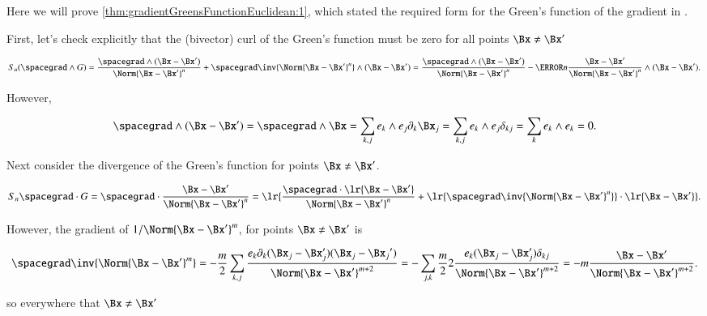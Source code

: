 %
%
\label{chap:gradientGreensFunctionProof}
Here we will prove \cref{thm:gradientGreensFunctionEuclidean:1}, which stated the required form for the Green's function of the gradient in .

First, let's check explicitly that the 
(bivector) curl of the Green's function must be zero for all
points \( \Bx \ne \Bx' \)

\begin{dmath}\label{eqn:gradientGreensFunctionProof:140}
S_n (\spacegrad \wedge G)
=
\frac{\spacegrad \wedge (\Bx-\Bx')}{\Norm{\Bx - \Bx'}^{n}}
+
\spacegrad \inv{\Norm{\Bx - \Bx'}^{n}} \wedge (\Bx-\Bx')
=
\frac{\spacegrad \wedge (\Bx-\Bx')}{\Norm{\Bx - \Bx'}^{n}}
- \cancel{n
\frac{\Bx - \Bx'}{\Norm{\Bx - \Bx'}^{n}} \wedge (\Bx-\Bx')}.
\end{dmath}

However,

\begin{dmath}\label{eqn:gradientGreensFunctionProof:160}
\spacegrad \wedge (\Bx-\Bx')
=
\spacegrad \wedge \Bx
=
\sum_{k,j} e_k \wedge e_j \partial_k \Bx_j
=
\sum_{k,j} e_k \wedge e_j \delta_{k j}
=
\sum_{k} e_k \wedge e_k
=
0.
\end{dmath}

Next consider the divergence of the Green's function for points \( \Bx \ne \Bx' \).

\begin{dmath}\label{eqn:gradientGreensFunctionProof:120}
S_n \spacegrad \cdot G
=
\spacegrad \cdot \frac{\Bx - \Bx'}{\Norm{\Bx - \Bx'}^n}
=
\lr{ \frac{\spacegrad \cdot \lr{\Bx - \Bx'}}{\Norm{\Bx - \Bx'}^{n}} + \lr{ \spacegrad \inv{\Norm{\Bx - \Bx'}^{n}} } \cdot \lr{ \Bx - \Bx'} }.
\end{dmath}

However, the gradient of \( 1/\Norm{\Bx - \Bx'}^m \), for points \( \Bx \ne \Bx' \) is

\begin{dmath}\label{eqn:gradientGreensFunctionProof:100}
\spacegrad \inv{\Norm{\Bx - \Bx'}^m}
=
-\frac{m}{2} \sum_{k,j} \frac{e_k \partial_k (\Bx_j - \Bx_j')(\Bx_j - {\Bx_j}')}{\Norm{\Bx - \Bx'}^{m+2}}
=
-\sum_{j,k} \frac{m}{2} 2 \frac{e_k (\Bx_j - \Bx_j') \delta_{k j} }{\Norm{\Bx - \Bx'}^{m+2}}
=
-m \frac{ \Bx - \Bx'}{\Norm{\Bx - \Bx'}^{m+2}}.
\end{dmath}

so everywhere that \( \Bx \ne \Bx' \)

